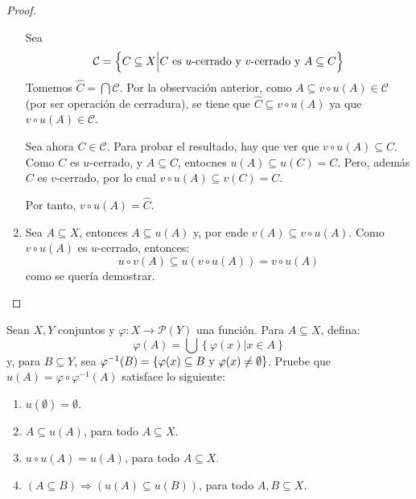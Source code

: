 \documentclass[12pt]{report}
\theoremstyle{largebreak}
\newcommand\cf[3]{\ensuremath{#1:#2\rightarrow#3}}
\begin{document}
\begin{proof}
\begin{enumerate}
            Sea
            \begin{equation*}
                \mathcal{C}=\left\{C\subseteq X\Big|C\textup{ es $u$-cerrado y $v$-cerrado y }A\subseteq C \right\}
            \end{equation*}
            Tomemos $\widehat{C}=\bigcap\mathcal{C}$. Por la observación anterior, como $A\subseteq v\circ u(A)\in\mathcal{C}$ (por ser operación de cerradura), se tiene que $\widehat{C}\subseteq v\circ u(A)$ ya que $v\circ u(A)\in\mathcal{C}$.

            Sea ahora $C\in\mathcal{C}$. Para probar el resultado, hay que ver que $v\circ u(A)\subseteq C$. Como $C$ es $u$-cerrado, y $A\subseteq C$, entocnes $u(A)\subseteq u(C)=C$. Pero, además $C$ es $v$-cerrado, por lo cual $v\circ u(A)\subseteq v(C)=C$.

            Por tanto, $v\circ u(A)=\widehat{C}$.

            \item Sea $A\subseteq X$, entonces $A\subseteq u(A)$ y, por ende $v(A)\subseteq v\circ u(A)$. Como $v\circ u(A)$ es $u$-cerrado, entonces:
            \begin{equation*}
                u\circ v(A)\subseteq u(v\circ u(A))=v\circ u(A)
            \end{equation*}
            como se quería demostrar.
        \end{enumerate}
    \end{proof}

    \begin{excer}
        Sean $X,Y$ conjuntos y $\cf{\varphi}{X}{\mathcal{P}(Y)}$ una función. Para $A\subseteq X$, defina:
        \begin{equation*}
            \varphi(A)=\bigcup\left\{\varphi(x)\Big|x\in A \right\}
        \end{equation*}
        y, para $B\subseteq Y$, sea $\varphi^{-1}(B)=\left\{\varphi(x)\subseteq B\textup{ y }\varphi(x)\neq\emptyset \right\}$. Pruebe que $u(A)=\varphi\circ\varphi^{-1}(A)$ satisface lo siguiente:
        \begin{enumerate}
            \item $u(\emptyset)=\emptyset$.
            \item $A\subseteq u(A)$, para todo $A\subseteq X$.
            \item $u\circ u(A)=u(A)$, para todo $A\subseteq X$.
            \item $(A\subseteq B)\Rightarrow(u(A)\subseteq u(B))$, para todo $A,B\subseteq X$.
        \end{enumerate}
    \end{excer}
\end{document}
